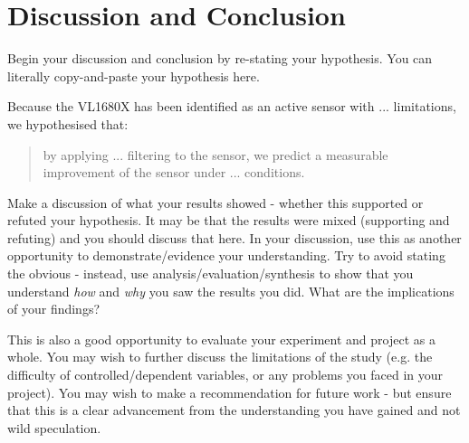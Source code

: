 \documentclass[conference]{IEEEtran}
\begin{document}
\section{Discussion and Conclusion}

Begin your discussion and conclusion by re-stating your hypothesis.  You can literally copy-and-paste your hypothesis here.  

Because the VL1680X has been identified as an active sensor with ... limitations, we hypothesised that:
\begin{quote}
    by applying ... filtering to the sensor, we predict a measurable improvement of the sensor under ... conditions.  
\end{quote}

Make a discussion of what your results showed - whether this supported or refuted your hypothesis.  It may be that the results were mixed (supporting and refuting) and you should discuss that here. In your discussion, use this as another opportunity to demonstrate/evidence your understanding. Try to avoid stating the obvious - instead, use analysis/evaluation/synthesis to show that you understand \emph{how} and \emph{why} you saw the results you did.  What are the implications of your findings?  

This is also a good opportunity to evaluate your experiment and project as a whole.  You may wish to further discuss the limitations of the study (e.g. the difficulty of controlled/dependent variables, or any problems you faced in your project).  You may wish to make a recommendation for future work - but ensure that this is a clear advancement from the understanding you have gained and not wild speculation.


 

\end{document}
